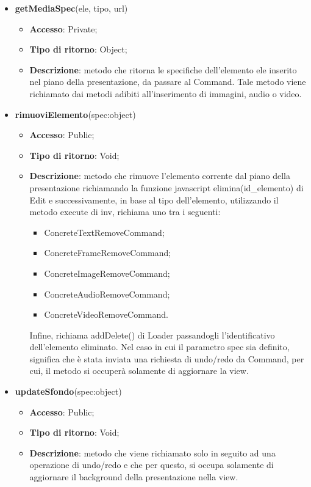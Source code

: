 {{\begin{itemize}
\begin{itemize}
			\end{itemize}
			\item \textbf{getMediaSpec}(ele, tipo, url)
			\begin{itemize}
				\item \textbf{Accesso}: Private;
				\item \textbf{Tipo di ritorno}: Object;
				\item \textbf{Descrizione}: metodo che ritorna le specifiche dell'elemento ele inserito nel piano della presentazione, da passare al Command. Tale metodo viene richiamato dai metodi adibiti all'inserimento di immagini, audio o video.
			\end{itemize}
			\item \textbf{rimuoviElemento}(spec:object)
			\begin{itemize}
				\item \textbf{Accesso}: Public;
				\item \textbf{Tipo di ritorno}: Void;
				\item \textbf{Descrizione}: metodo che rimuove l'elemento corrente dal piano della presentazione richiamando la funzione javascript elimina(id\_elemento) di Edit e successivamente, in base al tipo dell'elemento, utilizzando il metodo execute di inv, richiama uno tra i seguenti:
				\begin{itemize}
					\item ConcreteTextRemoveCommand;
					\item ConcreteFrameRemoveCommand;
					\item ConcreteImageRemoveCommand;
					\item ConcreteAudioRemoveCommand;
					\item ConcreteVideoRemoveCommand.
				\end{itemize}
				 Infine, richiama addDelete() di Loader passandogli l'identificativo dell'elemento eliminato. Nel caso in cui il parametro spec sia definito, significa che è stata inviata una richiesta di undo/redo da Command, per cui, il metodo si occuperà solamente di aggiornare la view.
			\end{itemize}
			\item \textbf{updateSfondo}(spec:object)
			\begin{itemize}
				\item \textbf{Accesso}: Public;
				\item \textbf{Tipo di ritorno}: Void;
				\item \textbf{Descrizione}: metodo che viene richiamato solo in seguito ad una operazione di undo/redo e che per questo, si occupa solamente di aggiornare il background della presentazione nella view.

\end{itemize}
\end{itemize}}}
